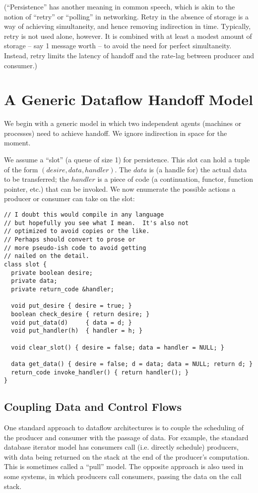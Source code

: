 \documentclass[dvips,10pt]{article}
\begin{document}
(``Persistence'' has another meaning in common speech, which is akin
to the notion of ``retry'' or ``polling'' in networking.  Retry in the
absence of storage is a way of achieving simultaneity, and hence
removing indirection in time.  Typically, retry is not used alone,
however. It is combined with at least a modest amount of storage --
say 1 message worth -- to avoid the need for perfect simultaneity.
Instead, retry limits the latency of handoff and the rate-lag between
producer and consumer.)

\section{A Generic Dataflow Handoff Model}
We begin with a generic model in which two independent agents
(machines or processes) need to achieve handoff.  We ignore
indirection in space for the moment.

We assume a ``slot'' (a queue of size 1) for persistence.  This slot
can hold a tuple of the form $(desire, data, handler)$.  The $data$ is
(a handle for) the actual data to be transferred; the $handler$ is a
piece of code (a continuation, functor, function pointer, etc.) that
can be invoked.  We now enumerate the possible actions a producer or
consumer can take on the slot:

\begin{verbatim}
// I doubt this would compile in any language 
// but hopefully you see what I mean.  It's also not
// optimized to avoid copies or the like.
// Perhaps should convert to prose or 
// more pseudo-ish code to avoid getting
// nailed on the detail.
class slot {
  private boolean desire;
  private data;
  private return_code &handler;

  void put_desire { desire = true; }
  boolean check_desire { return desire; }
  void put_data(d)     { data = d; }
  void put_handler(h)  { handler = h; }

  void clear_slot() { desire = false; data = handler = NULL; }

  data get_data() { desire = false; d = data; data = NULL; return d; }
  return_code invoke_handler() { return handler(); }
}
\end{verbatim}

\subsection{Coupling Data and Control Flows}
One standard approach to dataflow architectures is to couple the
scheduling of the producer and consumer with the passage of data.  For
example, the standard database iterator model has consumers call
(i.e. directly schedule) producers, with data being returned on the
stack at the end of the producer's computation.  This is sometimes
called a ``pull'' model.  The opposite approach is also used in some
systems, in which producers call consumers, passing the data on the
call stack.
\end{document}
